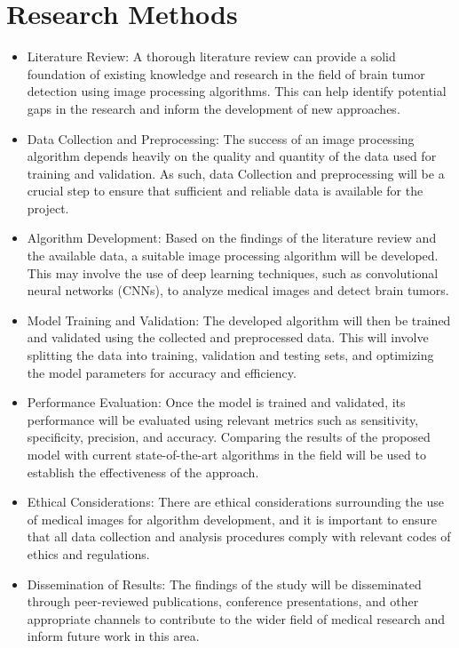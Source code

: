 \documentclass{article}
\begin{document}
\section{Research Methods}
\begin{itemize}
    \item Literature Review: A thorough literature review can provide a solid foundation of existing knowledge and research in the field of brain tumor detection using image processing algorithms. This can help identify potential gaps in the research and inform the development of new approaches.

\item Data Collection and Preprocessing: The success of an image processing algorithm depends heavily on the quality and quantity of the data used for training and validation. As such, data Collection and preprocessing will be a crucial step to ensure that sufficient and reliable data is available for the project.

\item Algorithm Development: Based on the findings of the literature review and the available data, a suitable image processing algorithm will be developed. This may involve the use of deep learning techniques, such as convolutional neural networks (CNNs), to analyze medical images and detect brain tumors.

\item Model Training and Validation: The developed algorithm will then be trained and validated using the collected and preprocessed data. This will involve splitting the data into training, validation and testing sets, and optimizing the model parameters for accuracy and efficiency.

\item Performance Evaluation: Once the model is trained and validated, its performance will be evaluated using relevant metrics such as sensitivity, specificity, precision, and accuracy. Comparing the results of the proposed model with current state-of-the-art algorithms in the field will be used to establish the effectiveness of the approach.

\item Ethical Considerations: There are ethical considerations surrounding the use of medical images for algorithm development, and it is important to ensure that all data collection and analysis procedures comply with relevant codes of ethics and regulations.

\item Dissemination of Results: The findings of the study will be disseminated through peer-reviewed publications, conference presentations, and other appropriate channels to contribute to the wider field of medical research and inform future work in this area.
\end{itemize}
\end{document}
